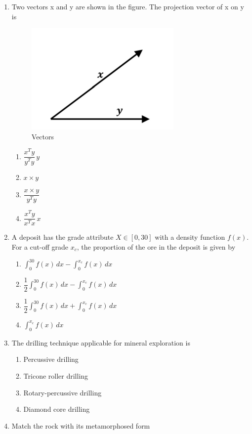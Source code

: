\documentclass[journal,12pt,onecolumn]{IEEEtran}
\theoremstyle{remark}
\begin{document}
\begin{enumerate}
 \item Two vectors x and y are shown in the figure. The projection vector of x on y is
 \begin{figure}[H]
  \centering
  \includegraphics[width=0.4\columnwidth]{figs/vec.png}
  \caption{Vectors}
  \label{fig:vec}
\end{figure}
\hfill{}
\begin{multicols}{4}
\begin{enumerate}
\item $\dfrac{x^T y}{y^T y} \, y$
\item $x \times y$
\item $\dfrac{x \times y}{y^T y}$
\item $\dfrac{x^T y}{x^T x} \, x$
\end{enumerate}
\end{multicols}

\item A deposit has the grade attribute $X \in [0,30]$ with a density function $f(x)$.  
For a cut-off grade $x_c$, the proportion of the ore in the deposit is given by 

\hfill{}
\begin{multicols}{2}
\begin{enumerate}
    \item $\int_{0}^{30} f(x)\,dx - \int_{0}^{x_c} f(x)\,dx$
    \item $\dfrac{1}{2} \int_{0}^{30} f(x)\,dx - \int_{0}^{x_c} f(x)\,dx$
    \item $\dfrac{1}{2} \int_{0}^{30} f(x)\,dx + \int_{0}^{x_c} f(x)\,dx$
    \item $\int_{0}^{x_c} f(x)\,dx$
\end{enumerate}
\end{multicols}

\item The drilling technique applicable for mineral exploration is 

\hfill{}
\begin{multicols}{2}
\begin{enumerate}
\item Percussive drilling 
\item Tricone roller drilling 
\item Rotary-percussive drilling
\item Diamond core drilling 
\end{enumerate}
\end{multicols}
\item Match the rock with its metamorphosed form


\end{enumerate}
\end{document}
